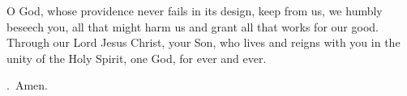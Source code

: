 \lettrine[lines=3]{O}{} God, whose providence never fails in its design,
keep from us, we humbly beseech you,
all that might harm us
and grant all that works for our good.
Through our Lord Jesus Christ, your Son,
who lives and reigns with you in the unity of the Holy Spirit,
one God, for ever and ever. \par \Rbar.~Amen.
